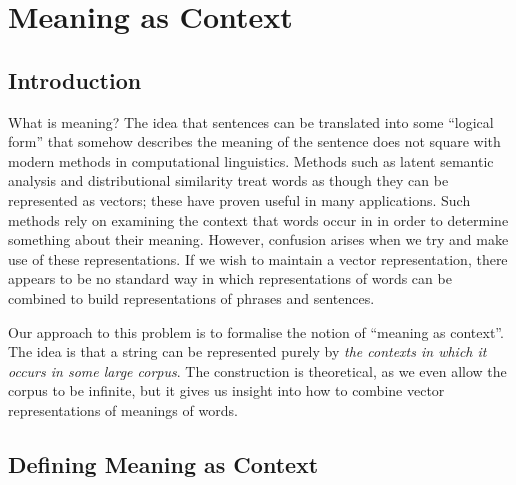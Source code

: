 \documentclass[12pt]{report}
\begin{document}
\chapter{Meaning as Context}


\section{Introduction}

What is meaning? The idea that sentences can be translated into some ``logical form'' that somehow describes the meaning of the sentence does not square with modern methods in computational linguistics. Methods such as latent semantic analysis and distributional similarity treat words as though they can be represented as vectors; these have proven useful in many applications. Such methods rely on examining the context that words occur in in order to determine something about their meaning. However, confusion arises when we try and make use of these representations. If we wish to maintain a vector representation, there appears to be no standard way in which representations of words can be combined to build representations of phrases and sentences.

Our approach to this problem is to formalise the notion of ``meaning as context''. The idea is that a string can be represented purely by \emph{the contexts in which it occurs in some large corpus}. The construction is theoretical, as we even allow the corpus to be infinite, but it gives us insight into how to combine vector representations of meanings of words.

\section{Defining Meaning as Context}
 
 
\end{document}

